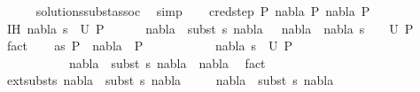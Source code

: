 \begin{isabellebody}
\ \ \ \ \isamarkupfalse%
\ solutions{\isacharunderscore}{\kern0pt}subst{\isacharunderscore}{\kern0pt}assoc\ \isamarkupfalse%
\ simp\isanewline
{}\isamarkupfalse%
\isanewline
\ \ \isamarkupfalse%
\ {\isacharparenleft}{\kern0pt}cred{\isacharunderscore}{\kern0pt}step\ P{}\ nabla\ P{}\ nabla{}\ P{}{\isacharparenright}{\kern0pt}\isanewline
\ \ \isamarkupfalse%
\ IH{\isacharcolon}{\kern0pt}\ {\isachardoublequoteopen}{\isacharparenleft}{\kern0pt}nabla{}{\isacharcomma}{\kern0pt}\ s{}{\isacharparenright}{\kern0pt}\ {\isasymin}\ U\ P{}\ {\isasymLongrightarrow}\isanewline
\ \ \ \ \ nabla{}\ {\isasymTurnstile}\ {\isacharparenleft}{\kern0pt}subst\ s{}{\isacharparenright}{\kern0pt}\ nabla{}\ \ {\isasymLongrightarrow}\ {\isacharparenleft}{\kern0pt}nabla{}\ {\isasymunion}\ nabla{}{\isacharcomma}{\kern0pt}\ s{}\ {\isasymbullet}\ {\isacharbrackleft}{\kern0pt}{\isacharbrackright}{\kern0pt}{\isacharparenright}{\kern0pt}\ {\isasymin}\ U\ P{}{\isachardoublequoteclose}\ \isamarkupfalse%
\ fact\isanewline
\ \ \isamarkupfalse%
\ as{\isacharcolon}{\kern0pt}\ {\isachardoublequoteopen}P{}\ {\isasymturnstile}\ nabla\ {\isasymrightarrow}\ P{}{\isachardoublequoteclose}\isanewline
\ \ \ \ \ \ \ \ \ \ \ {\isachardoublequoteopen}{\isacharparenleft}{\kern0pt}nabla{}{\isacharcomma}{\kern0pt}\ s{}{\isacharparenright}{\kern0pt}\ {\isasymin}\ U\ P{}{\isachardoublequoteclose}\isanewline
\ \ \ \ \ \ \ \ \ \ \ {\isachardoublequoteopen}nabla{}\ {\isasymTurnstile}\ {\isacharparenleft}{\kern0pt}subst\ s{}{\isacharparenright}{\kern0pt}\ {\isacharparenleft}{\kern0pt}nabla{}\ {\isasymunion}\ nabla{\isacharparenright}{\kern0pt}{\isachardoublequoteclose}\ \isamarkupfalse%
\ fact{\isacharplus}{\kern0pt}\isanewline
\ \ \isamarkupfalse%
\ ext{\isacharunderscore}{\kern0pt}substs{\isacharcolon}{\kern0pt}\ {\isachardoublequoteopen}nabla{}\ {\isasymTurnstile}\ {\isacharparenleft}{\kern0pt}subst\ s{}{\isacharparenright}{\kern0pt}\ {\isacharparenleft}{\kern0pt}nabla{}{\isacharparenright}{\kern0pt}{\isachardoublequoteclose}\ \isanewline
\ \ \ \ {\isachardoublequoteopen}nabla{}\ {\isasymTurnstile}\ {\isacharparenleft}{\kern0pt}subst\ s{}{\isacharparenright}{\kern0pt}\ nabla{\isachardoublequoteclose}\isanewline

\end{isabellebody}
